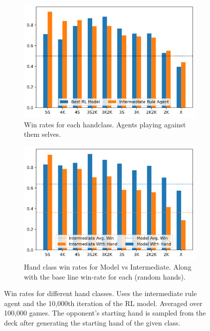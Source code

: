 \documentclass[../main.tex]{subfiles}
\begin{document}
\begin{figure}
    \centering
    \begin{subfigure}[t]{0.49\textwidth}
        \centering
        \includegraphics[width=\textwidth,keepaspectratio]{images/results/handclasses.png}
        \caption{Win rates for each handclass. Agents playing against them selves.}
        \label{fig:handclass-vs-self}
    \end{subfigure}
    \hfill
    \begin{subfigure}[t]{0.49\textwidth}
        \centering
        \includegraphics[width=\textwidth,keepaspectratio]{images/results/handclasses_model_vs_rules.png}
        \caption{Hand class win rates for Model vs Intermediate. Along with the base line win-rate for each (random hands).}
        \label{fig:handclass-int-vs-model}
    \end{subfigure}
    \label{fig:handclass-winrates}
    \caption{Win rates for different hand classes. Uses the intermediate rule agent and the 10,000th iteration of the RL model. Averaged over 100,000 games. The opponent's starting hand is sampled from the deck after generating the starting hand of the given class.}
\end{figure}
\end{document}
